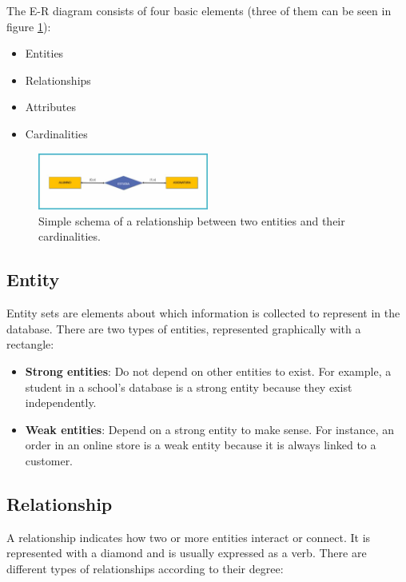 \documentclass{article}
\begin{document}
The E-R diagram consists of four basic elements (three of them can be seen in figure \ref{fig:erexample1}):

\begin{itemize}
    \item Entities
    \item Relationships
    \item Attributes
    \item Cardinalities
\end{itemize}

\begin{figure}
	\centering
	\includegraphics[bb=0 0 900 300, width=0.5\textwidth]{figures/entidad-relacion-ejemplo.jpg}
	\caption{Simple schema of a relationship between two entities and their cardinalities.}
	\label{fig:erexample1}
\end{figure}

\subsection{Entity}

Entity sets are elements about which information is collected to represent in the database. There are two types of entities, represented graphically with a rectangle:

\begin{itemize}
    \item \textbf{Strong entities}: Do not depend on other entities to exist. For example, a student in a school's database is a strong entity because they exist independently.
    \item \textbf{Weak entities}: Depend on a strong entity to make sense. For instance, an order in an online store is a weak entity because it is always linked to a customer.
\end{itemize}

\subsection{Relationship}

A relationship indicates how two or more entities interact or connect. It is represented with a diamond and is usually expressed as a verb. There are different types of relationships according to their degree:
\end{document}
